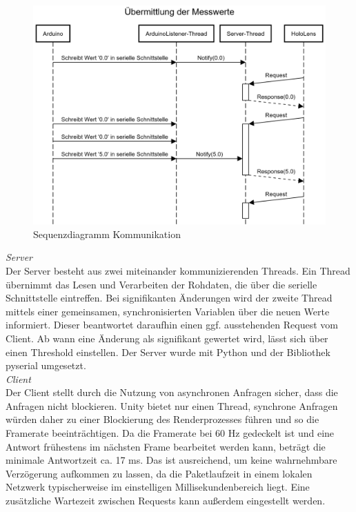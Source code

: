 \begin{figure}[H]
	\centering
	\includegraphics[width=1\textwidth]{images/Sequenzdiagramm.png}
	\caption{Sequenzdiagramm Kommunikation}
	\label{img:Sequenzdiagramm}
\end{figure}

\textit{Server}\\
Der Server besteht aus zwei miteinander kommunizierenden Threads. Ein Thread übernimmt das Lesen und Verarbeiten der Rohdaten, die über die serielle Schnittstelle eintreffen. Bei signifikanten Änderungen wird der zweite Thread mittels einer gemeinsamen, synchronisierten Variablen über die neuen Werte informiert. Dieser beantwortet daraufhin einen ggf. ausstehenden Request vom Client. Ab wann eine Änderung als signifikant gewertet wird, lässt sich über einen Threshold einstellen. Der Server wurde mit Python und der Bibliothek pyserial umgesetzt.\\

\textit{Client}\\
Der Client stellt durch die Nutzung von asynchronen Anfragen sicher, dass die Anfragen nicht blockieren. Unity bietet nur einen Thread, synchrone Anfragen würden daher zu einer Blockierung des Renderprozesses führen und so die Framerate beeinträchtigen. Da die Framerate bei 60 Hz gedeckelt ist und eine Antwort frühestens im nächsten Frame bearbeitet werden kann, beträgt die minimale Antwortzeit ca. 17 ms. Das ist ausreichend, um keine wahrnehmbare Verzögerung aufkommen zu lassen, da die Paketlaufzeit in einem lokalen Netzwerk typischerweise im einstelligen Millisekundenbereich liegt. Eine zusätzliche Wartezeit zwischen Requests kann außerdem eingestellt werden.\\

